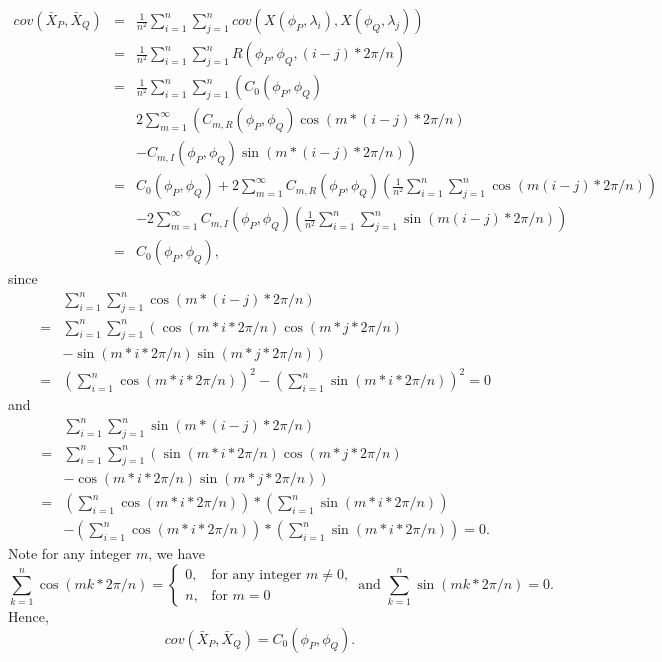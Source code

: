 \begin{eqnarray*}
				cov(\bar{X}_P, \bar{X}_Q) &=&  \frac{1}{n^2}\sum_{i = 1}^n \sum_{j=1}^n cov(X(\phi_P, \lambda_i), X(\phi_Q, \lambda_j)) \\
				&=& \frac{1}{n^2}\sum_{i = 1}^n \sum_{j=1}^n R(\phi_P, \phi_Q, (i-j)*2\pi/n) \\
				&=& \frac{1}{n^2}\sum_{i = 1}^n \sum_{j=1}^n \left( C_0(\phi_P, \phi_Q) \right.\\
				& &  2\sum_{m=1}^\infty \left( C_{m, R}(\phi_P, \phi_Q) \cos(m*(i-j)*2\pi/n) \right. \\
				& & \left.- C_{m, I}(\phi_P, \phi_Q) \sin(m*(i-j)*2\pi/n) \right) \\
				&=& C_0(\phi_P, \phi_Q) + 2\sum_{m=1}^\infty C_{m, R}(\phi_P, \phi_Q) \left(\frac{1}{n^2}\sum_{i = 1}^n \sum_{j=1}^n \cos(m(i-j)*2\pi/n)\right) \\
				& & - 2\sum_{m=1}^\infty C_{m, I}(\phi_P, \phi_Q) \left(\frac{1}{n^2}\sum_{i = 1}^n \sum_{j=1}^n \sin(m(i-j)*2\pi/n)\right) \\
				&=& C_0(\phi_P, \phi_Q),
			\end{eqnarray*}			
since
			\begin{eqnarray*}
				& & \sum_{i = 1}^n \sum_{j=1}^n \cos(m*(i-j)*2\pi/n) \\
				&=& \sum_{i=1}^n \sum_{j=1}^n \left(\cos(m*i *2\pi/n)\cos(m*j*2\pi/n)\right. \\
				& & - \left.\sin(m*i *2\pi/n)\sin(m*j*2\pi/n) \right)\\
				&=& \left(\sum_{i=1}^n \cos(m*i *2\pi/n)\right)^2 - \left(\sum_{i=1}^n \sin(m*i *2\pi/n)\right)^2 = 0
			\end{eqnarray*}
and
			\begin{eqnarray*}
				& & \sum_{i = 1}^n \sum_{j=1}^n \sin(m*(i-j)*2\pi/n) \\
				&=& \sum_{i=1}^n \sum_{j=1}^n \left(\sin(m*i *2\pi/n)\cos(m*j*2\pi/n)\right. \\
				& & - \left.\cos(m*i *2\pi/n)\sin(m*j*2\pi/n) \right)\\
				&=& \left(\sum_{i=1}^n \cos(m*i *2\pi/n)\right)* \left(\sum_{i=1}^n \sin(m*i *2\pi/n)\right) \\
				& & - \left(\sum_{i=1}^n \cos(m*i *2\pi/n)\right)* \left(\sum_{i=1}^n \sin(m*i *2\pi/n)\right) = 0.
			\end{eqnarray*}
Note for any integer $m$, we have
			\[
				\sum_{k = 1}^{n} \cos(mk*2\pi/n) = \left\{\begin{array}{cc}
				0, & \mbox{for any integer $m \ne 0$,}  \\
				n, & \mbox{for $m = 0$}
				\end{array}
				\right. \mbox{ and }
				\sum_{k = 1}^{n} \sin(mk*2\pi/n) = 0.
			\]
Hence,
			\[
				cov(\bar{X}_P, \bar{X}_Q) = C_0 (\phi_P, \phi_Q).
			\]
				
